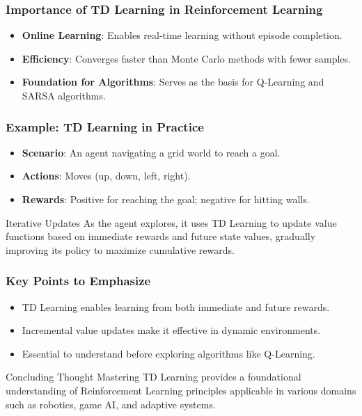 \documentclass[aspectratio=169]{beamer}
\begin{document}
\begin{frame}[fragile]
    \frametitle{Importance of TD Learning in Reinforcement Learning}
    \begin{itemize}
        \item \textbf{Online Learning}: Enables real-time learning without episode completion.
        \item \textbf{Efficiency}: Converges faster than Monte Carlo methods with fewer samples.
        \item \textbf{Foundation for Algorithms}: Serves as the basis for Q-Learning and SARSA algorithms.
    \end{itemize}
\end{frame}

\begin{frame}[fragile]
    \frametitle{Example: TD Learning in Practice}
    \begin{itemize}
        \item \textbf{Scenario}: An agent navigating a grid world to reach a goal.
        \item \textbf{Actions}: Moves (up, down, left, right).
        \item \textbf{Rewards}: Positive for reaching the goal; negative for hitting walls.
    \end{itemize}
    \begin{block}{Iterative Updates}
        As the agent explores, it uses TD Learning to update value functions based on immediate rewards and future state values, gradually improving its policy to maximize cumulative rewards.
    \end{block}
\end{frame}

\begin{frame}[fragile]
    \frametitle{Key Points to Emphasize}
    \begin{itemize}
        \item TD Learning enables learning from both immediate and future rewards.
        \item Incremental value updates make it effective in dynamic environments.
        \item Essential to understand before exploring algorithms like Q-Learning.
    \end{itemize}
    \begin{block}{Concluding Thought}
        Mastering TD Learning provides a foundational understanding of Reinforcement Learning principles applicable in various domains such as robotics, game AI, and adaptive systems.
    \end{block}
\end{frame}
\end{document}
